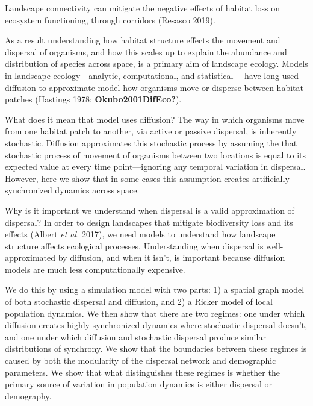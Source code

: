 \documentclass[10pt,oneside]{article}
\begin{document}
Landscape connectivity can mitigate the negative effects of habitat loss
on ecosystem functioning, through corridors (Resasco 2019).

As a result understanding how habitat structure effects the movement and
dispersal of organisms, and how this scales up to explain the abundance
and distribution of species across space, is a primary aim of landscape
ecology. Models in landscape ecology---analytic, computational, and
statistical--- have long used diffusion to approximate model how
organisms move or disperse between habitat patches (Hastings 1978;
\textbf{Okubo2001DifEco?}).

What does it mean that model uses diffusion? The way in which organisms
move from one habitat patch to another, via active or passive dispersal,
is inherently stochastic. Diffusion approximates this stochastic process
by assuming the that stochastic process of movement of organisms between
two locations is equal to its expected value at every time
point---ignoring any temporal variation in dispersal. However, here we
show that in some cases this assumption creates artificially
synchronized dynamics across space.

Why is it important we understand when dispersal is a valid
approximation of dispersal? In order to design landscapes that mitigate
biodiversity loss and its effects (Albert \emph{et al.} 2017), we need
models to understand how landscape structure affects ecological
processes. Understanding when dispersal is well-approximated by
diffusion, and when it isn't, is important because diffusion models are
much less computationally expensive.

We do this by using a simulation model with two parts: 1) a spatial
graph model of both stochastic dispersal and diffusion, and 2) a Ricker
model of local population dynamics. We then show that there are two
regimes: one under which diffusion creates highly synchronized dynamics
where stochastic dispersal doesn't, and one under which diffusion and
stochastic dispersal produce similar distributions of synchrony. We show
that the boundaries between these regimes is caused by both the
modularity of the dispersal network and demographic parameters. We show
that what distinguishes these regimes is whether the primary source of
variation in population dynamics is either dispersal or demography.
\end{document}
